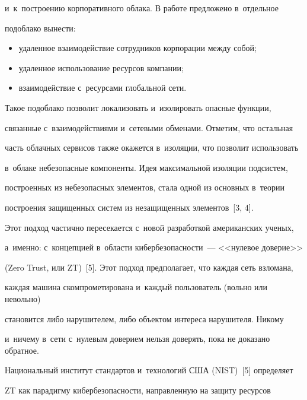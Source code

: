 {и~к~построению корпоративного облака. В работе предложено в~отдельное 


подоблако вынести: 


  \begin{itemize}


\item удаленное взаимодействие сотрудников корпорации между собой;


\item удаленное использование ресурсов компании; 


\item взаимодействие с~ресурсами глобальной сети. 


\end{itemize}





  Такое подоблако позволит локализовать и~изолировать опасные функции, 


связанные с~взаимодействиями и~сетевыми обменами. Отметим, что остальная 


часть облачных сервисов также окажется в~изоляции, что позволит использовать 


в~облаке небезопасные компоненты. Идея максимальной изоляции подсистем, 


построенных из небезопасных элементов, стала одной из основных в~теории 


построения защищенных систем из незащищенных элементов~[3, 4].


  


  Этот подход частично пересекается с~новой разработкой американских ученых, 


а~именно: с~концепцией в~области кибербезопасности~--- <<нулевое доверие>> 


(Zero Trust, или ZT)~[5]. Этот подход предполагает, что каждая сеть взломана, 


каждая машина скомпрометирована и~каждый пользователь (вольно или невольно) 


становится либо нарушителем, либо объектом интереса нарушителя. Никому 


и~ничему в~сети с~нулевым доверием нельзя доверять, пока не доказано обратное. 


  


  Национальный институт стандартов и~технологий США (NIST)~[5] определяет 


ZT как парадигму ки\-бер\-безопас\-ности, направленную на защиту ресурсов 


}
